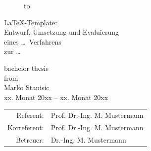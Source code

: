 \begin{titlepage}
\begin{figure}
  \begin{center}
    \hbox to 
  \end{center}
\end{figure}

\begin{center}
\rule{0pt}{0pt}
\vfill
\vfill
\vfill
\vfill

\begin{huge}
\LaTeX-Template:\\[0.75ex]
Entwurf, Umsetzung und Evaluierung\\[0.75ex]
eines \dots\ Verfahrens\\[0.75ex]
zur \dots\\[0.75ex]
\end{huge}

\vfill
\vfill

bachelor thesis\\from\\

\vspace*{.5cm}
Marko Stanisic\\
\vspace{.5cm}
xx. Monat 20xx -- xx. Monat 20xx \\

\vfill
\vfill
\vfill
\vfill

\begin{tabular}{rl}
Referent:   & Prof. Dr.-Ing. M. Mustermann\\
Korreferent:   & Prof. Dr.-Ing. M. Mustermann\\

Betreuer:   & Dr.-Ing. M. Mustermann\\
\end{tabular}
\end{center}
\end{titlepage}



